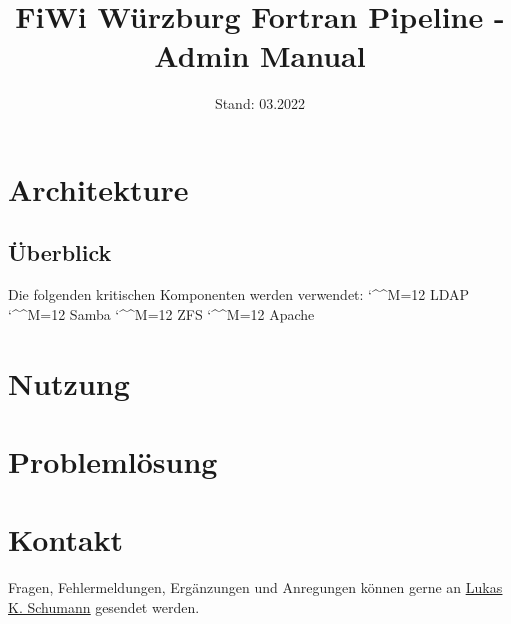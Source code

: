 \documentclass[11pt, a4paper]{article}
\title{\vspace{+3cm}FiWi Würzburg Fortran Pipeline - Admin Manual}
\date{Stand: 03.2022}
\def\e{\begingroup\catcode`\^^M=12 \xmymacro}
{\catcode`\^^M=12 %
 \gdef\xmymacro#1^^M{\begin{itemize}\item #1\end{itemize}\endgroup}%
}
\begin{document}
\maketitle

\tableofcontents
\clearpage

\bigskip\noindent


\vspace{-1cm}
\section{Architekture}

\subsection{Überblick}
Die folgenden kritischen Komponenten werden verwendet:
\e LDAP
\e Samba
\e ZFS
\e Apache

\section{Nutzung}

\section{Problemlösung}

\section{Kontakt}

Fragen, Fehlermeldungen, Ergänzungen und Anregungen können gerne an \underline{\href{mailto:lukas_kilian.schumann@stud-mail.uni-wuerzburg.de}{Lukas K. Schumann}} gesendet werden.
\end{document}
